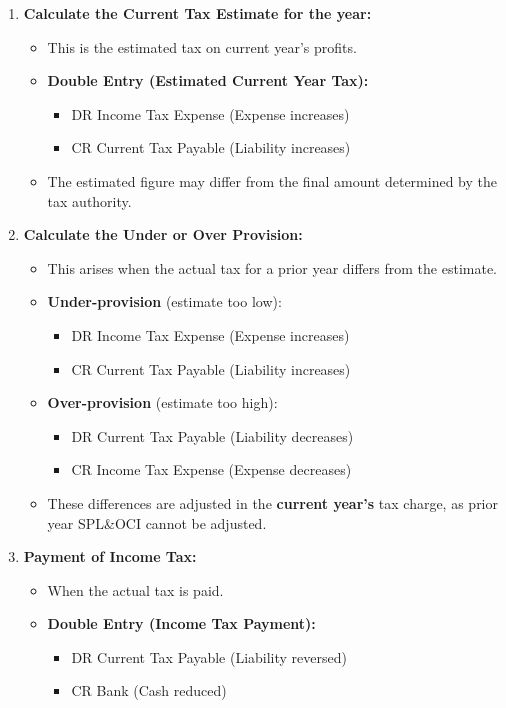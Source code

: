 \begin{enumerate}
    \item \textbf{Calculate the Current Tax Estimate for the year:}
    \begin{itemize}
        \item This is the estimated tax on current year's profits.
        \item \textbf{Double Entry (Estimated Current Year Tax):}
        \begin{itemize}
            \item DR Income Tax Expense (Expense increases)
            \item CR Current Tax Payable (Liability increases)
        \end{itemize}
        \item The estimated figure may differ from the final amount determined by the tax authority.
    \end{itemize}
    \item \textbf{Calculate the Under or Over Provision:}
    \begin{itemize}
        \item This arises when the actual tax for a prior year differs from the estimate.
        \item \textbf{Under-provision} (estimate too low):
        \begin{itemize}
            \item DR Income Tax Expense (Expense increases)
            \item CR Current Tax Payable (Liability increases)
        \end{itemize}
        \item \textbf{Over-provision} (estimate too high):
        \begin{itemize}
            \item DR Current Tax Payable (Liability decreases)
            \item CR Income Tax Expense (Expense decreases)
        \end{itemize}
        \item These differences are adjusted in the \textbf{current year's} tax charge, as prior year SPL\&OCI cannot be adjusted.
    \end{itemize}
    \item \textbf{Payment of Income Tax:}
    \begin{itemize}
        \item When the actual tax is paid.
        \item \textbf{Double Entry (Income Tax Payment):}
        \begin{itemize}
            \item DR Current Tax Payable (Liability reversed)
            \item CR Bank (Cash reduced)
        \end{itemize}
    \end{itemize}
\end{enumerate}

